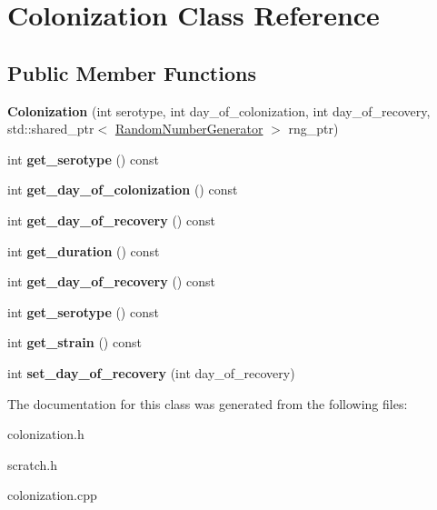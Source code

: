 \hypertarget{class_colonization}{}\section{Colonization Class Reference}
\label{class_colonization}
\subsection*{Public Member Functions}
\begin{DoxyCompactItemize}
\item 
\mbox{\label{class_colonization_a2883576163fee3a0e74c5648fa0ca65c}} 
{\bfseries Colonization} (int serotype, int day\+\_\+of\+\_\+colonization, int day\+\_\+of\+\_\+recovery, std\+::shared\+\_\+ptr$<$ \hyperlink{class_random_number_generator}{Random\+Number\+Generator} $>$ rng\+\_\+ptr)
\item 
\mbox{\label{class_colonization_a74fb804ee283c87eb384954a3486ea00}} 
int {\bfseries get\+\_\+serotype} () const
\item 
\mbox{\label{class_colonization_acbcd7197c6b4a91d9ea6022b3b4440ef}} 
int {\bfseries get\+\_\+day\+\_\+of\+\_\+colonization} () const
\item 
\mbox{\label{class_colonization_a68e647e564464a50c29c2163aae25139}} 
int {\bfseries get\+\_\+day\+\_\+of\+\_\+recovery} () const
\item 
\mbox{\label{class_colonization_a264a0feb9ab1137651bb498d27359253}} 
int {\bfseries get\+\_\+duration} () const
\item 
\mbox{\label{class_colonization_a68e647e564464a50c29c2163aae25139}} 
int {\bfseries get\+\_\+day\+\_\+of\+\_\+recovery} () const
\item 
\mbox{\label{class_colonization_a74fb804ee283c87eb384954a3486ea00}} 
int {\bfseries get\+\_\+serotype} () const
\item 
\mbox{\label{class_colonization_a40c2ffa11df244dfaba2cb5cb117f7d6}} 
int {\bfseries get\+\_\+strain} () const
\item 
\mbox{\label{class_colonization_a3bf78b5c32ea3694e2c20852c203b3dc}} 
int {\bfseries set\+\_\+day\+\_\+of\+\_\+recovery} (int day\+\_\+of\+\_\+recovery)
\end{DoxyCompactItemize}


The documentation for this class was generated from the following files\+:\begin{DoxyCompactItemize}
\item 
colonization.\+h\item 
scratch.\+h\item 
colonization.\+cpp\end{DoxyCompactItemize}
